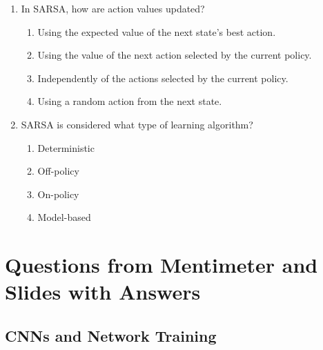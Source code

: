 \documentclass{report}
\numberwithin{equation}{section}
\begin{document}
\begin{enumerate}
\item In SARSA, how are action values updated?
\begin{enumerate}[label=\alph*.]
    \item Using the expected value of the next state's best action.
    \item Using the value of the next action selected by the current policy.
    \item Independently of the actions selected by the current policy.
    \item Using a random action from the next state.
\end{enumerate}

\item SARSA is considered what type of learning algorithm?
\begin{enumerate}[label=\alph*.]
    \item Deterministic
    \item Off-policy
    \item On-policy
    \item Model-based
\end{enumerate}

\end{enumerate}

\chapter{Questions from Mentimeter and Slides with Answers}
\renewcommand{\thesection}{2-3}
\section{CNNs and Network Training}
\end{document}
